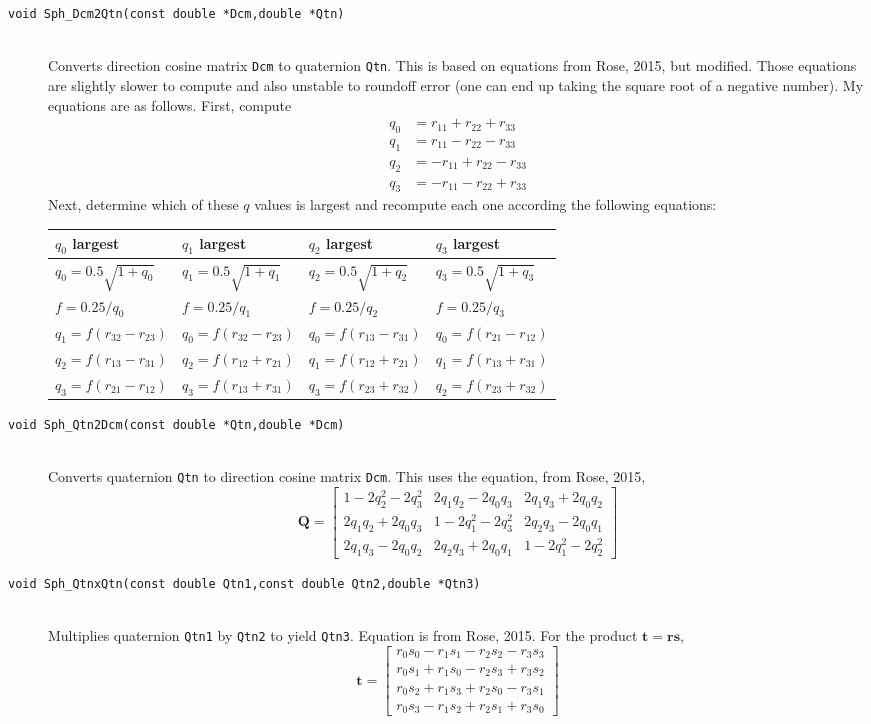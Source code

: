 \documentclass[11pt]{article}
\newcommand {\ttt} {\texttt}
\begin{document}
\begin{description}
\item[\ttt{void Sph\_Dcm2Qtn(const double *Dcm,double *Qtn)}]
\hfill \\
Converts direction cosine matrix \ttt{Dcm} to quaternion \ttt{Qtn}. This is based on equations from Rose, 2015, but modified. Those equations are slightly slower to compute and also unstable to roundoff error (one can end up taking the square root of a negative number). My equations are as follows. First, compute
\begin{align*}
q_0 &= r_{11}+r_{22}+r_{33} \\
q_1 &= r_{11}-r_{22}-r_{33} \\
q_2 &= -r_{11}+r_{22}-r_{33} \\
q_3 &= -r_{11}-r_{22}+r_{33}
\end{align*}
Next, determine which of these $q$ values is largest and recompute each one according the following equations:

\begin{tabular}{llll}
$q_0$ largest & $q_1$ largest & $q_2$ largest & $q_3$ largest \\
\hline
$q_0 = 0.5 \sqrt{1+q_0}$ & $q_1 = 0.5 \sqrt{1+q_1}$ & $q_2 = 0.5 \sqrt{1+q_2}$ & $q_3 = 0.5 \sqrt{1+q_3}$ \\
$f = 0.25/q_0$ & $f = 0.25/q_1$ & $f = 0.25/q_2$ & $f = 0.25/q_3$ \\
$q_1=f(r_{32}-r_{23})$ & $q_0=f(r_{32}-r_{23})$ & $q_0=f(r_{13}-r_{31})$ & $q_0=f(r_{21}-r_{12})$ \\
$q_2=f(r_{13}-r_{31})$ & $q_2=f(r_{12}+r_{21})$ & $q_1=f(r_{12}+r_{21})$ & $q_1=f(r_{13}+r_{31})$ \\
$q_3=f(r_{21}-r_{12})$ & $q_3=f(r_{13}+r_{31})$ & $q_3=f(r_{23}+r_{32})$ & $q_2=f(r_{23}+r_{32})$
\end{tabular}


\item[\ttt{void Sph\_Qtn2Dcm(const double *Qtn,double *Dcm)}]
\hfill \\
Converts quaternion \ttt{Qtn} to direction cosine matrix \ttt{Dcm}. This uses the equation, from Rose, 2015,
$$\bm{Q} = \left[ \begin{array}{ccc}
1-2q_2^2-2q_3^2 & 2q_1q_2-2q_0q_3 & 2q_1q_3+2q_0q_2\\
2q_1q_2+2q_0q_3 & 1-2q_1^2-2q_3^2 & 2q_2q_3-2q_0q_1\\
2q_1q_3-2q_0q_2 & 2q_2q_3+2q_0q_1 & 1-2q_1^2-2q_2^2
\end{array} \right]$$


\item[\ttt{void Sph\_QtnxQtn(const double Qtn1,const double Qtn2,double *Qtn3)}]
\hfill \\
Multiplies quaternion \ttt{Qtn1} by \ttt{Qtn2} to yield \ttt{Qtn3}. Equation is from Rose, 2015. For the product $\bm{t}=\bm{r}\bm{s}$,
$$\bm{t}=\left[\begin{array}{c}
r_0s_0 - r_1s_1 - r_2s_2 - r_3s_3 \\
r_0s_1 + r_1s_0 - r_2s_3 + r_3s_2 \\
r_0s_2 + r_1s_3 + r_2s_0 - r_3s_1 \\
r_0s_3 - r_1s_2 + r_2s_1 + r_3s_0
\end{array} \right]$$



\end{description}
\end{document}
